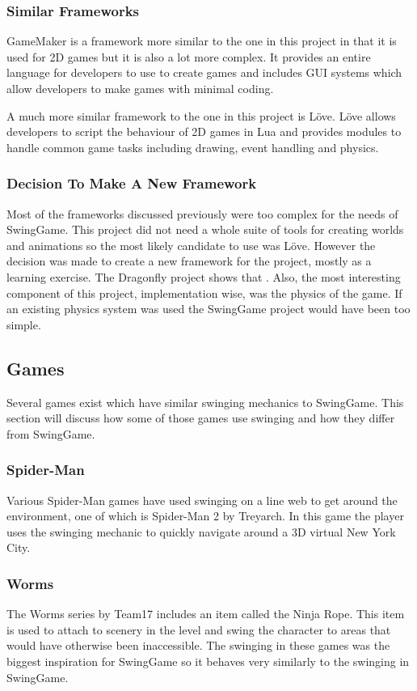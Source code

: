 \documentclass[]{report}
\begin{document}
			\subsubsection{Similar Frameworks}
			GameMaker\cite{gamemaker} is a framework more similar to the one in this project in that it is used for 2D games but it is also a lot more complex. It provides an entire language for developers to use to create games and includes GUI systems which allow developers to make games with minimal coding.
			
			A much more similar framework to the one in this project is Löve\cite{love}. Löve allows developers to script the behaviour of 2D games in Lua and provides modules to handle common game tasks including drawing, event handling and physics.
			\subsubsection{Decision To Make A New Framework}
			Most of the frameworks discussed previously were too complex for the needs of SwingGame. This project did not need a whole suite of tools for creating worlds and animations so the most likely candidate to use was Löve. However the decision was made to create a new framework for the project, mostly as a learning exercise. The Dragonfly project shows that \cite{dragonfly}. Also, the most interesting component of this project, implementation wise, was the physics of the game. If an existing physics system was used the SwingGame project would have been too simple.
			
		\subsection{Games}
		Several games exist which have similar swinging mechanics to SwingGame. This section will discuss how some of those games use swinging and how they differ from SwingGame.
			\subsubsection{Spider-Man}
			Various Spider-Man games have used swinging on a line web to get around the environment, one of which is Spider-Man 2\cite{spiderman} by Treyarch. In this game the player uses the swinging mechanic to quickly navigate around a 3D virtual New York City.
			\subsubsection{Worms}
			The Worms\cite{worms} series by Team17 includes an item called the Ninja Rope. This item is used to attach to scenery in the level and swing the character to areas that would have otherwise been inaccessible. The swinging in these games was the biggest inspiration for SwingGame so it behaves very similarly to the swinging in SwingGame.
\end{document}

